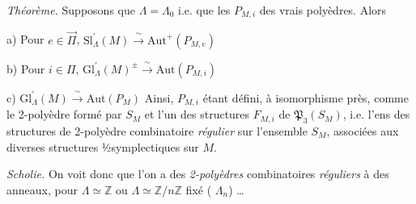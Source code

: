 \documentclass[11pt,a4paper]{article}
\begin{document}
\emph{Théorème.} Supposons que $\Lambda=\Lambda_0$ i.e. que les $P_{M,i}$ 
 des vrais polyèdres. Alors

a) Pour $e\in\vec{\Pi}$, $\mathrm{Sl}^{\prime}_\Lambda(M)\xrightarrow{\ \sim\ }\mathrm{Aut}^{+}(P_{M,e})$

b) Pour $i\in\Pi$, $\mathrm{Gl}^{\prime}_\Lambda(M)^{\pm}\xrightarrow{\ \sim\ }\mathrm{Aut}(P_{M,i})$

c)  $\mathrm{Gl}^{\prime}_\Lambda(M)\xrightarrow{\ \sim\ }\mathrm{Aut}(P_M)$
Ainsi, $P_{M,i}$ étant défini, à isomorphisme près, comme le 2-polyèdre formé par $S_M$ et
l'un des structures $F_{M,i}$ de $\mathfrak{P}_3(S_M)$, i.e. l'ens des
structures de 2-polyèdre combinatoire \emph{régulier} sur l'ensemble $S_M$, associées aux
diverses structures ½symplectiques sur $M$.

\emph{Scholie.} On voit donc que l'on a des \emph{2-polyèdres} combinatoires
\emph{réguliers}  à des \ill{} anneaux, pour $\Lambda\simeq\mathbb{Z}$
ou $\Lambda\simeq\mathbb{Z}/n\mathbb{Z}$ fixé
( $\Lambda_n$) …
\end{document}
